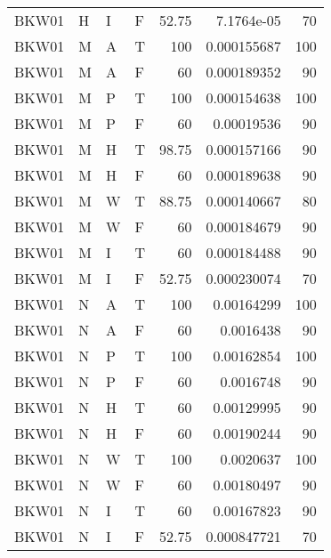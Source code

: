 \begin{table}[htb!]
{\begin{tabular}{llllrrr}
   BKW01    & H     & I     & F          & 52.75      & 7.1764e-05  & 70       \\
   BKW01    & M     & A     & T          & 100        & 0.000155687 & 100      \\
   BKW01    & M     & A     & F          & 60         & 0.000189352 & 90       \\
   BKW01    & M     & P     & T          & 100        & 0.000154638 & 100      \\
   BKW01    & M     & P     & F          & 60         & 0.00019536  & 90       \\
   BKW01    & M     & H     & T          & 98.75      & 0.000157166 & 90       \\
   BKW01    & M     & H     & F          & 60         & 0.000189638 & 90       \\
   BKW01    & M     & W     & T          & 88.75      & 0.000140667 & 80       \\
   BKW01    & M     & W     & F          & 60         & 0.000184679 & 90       \\
   BKW01    & M     & I     & T          & 60         & 0.000184488 & 90       \\
   BKW01    & M     & I     & F          & 52.75      & 0.000230074 & 70       \\
   BKW01    & N     & A     & T          & 100        & 0.00164299  & 100      \\
   BKW01    & N     & A     & F          & 60         & 0.0016438   & 90       \\
   BKW01    & N     & P     & T          & 100        & 0.00162854  & 100      \\
   BKW01    & N     & P     & F          & 60         & 0.0016748   & 90       \\
   BKW01    & N     & H     & T          & 60         & 0.00129995  & 90       \\
   BKW01    & N     & H     & F          & 60         & 0.00190244  & 90       \\
   BKW01    & N     & W     & T          & 100        & 0.0020637   & 100      \\
   BKW01    & N     & W     & F          & 60         & 0.00180497  & 90       \\
   BKW01    & N     & I     & T          & 60         & 0.00167823  & 90       \\
   BKW01    & N     & I     & F          & 52.75      & 0.000847721 & 70       \\
   \hline
  \end{tabular}
 }{
 }
\end{table} 
